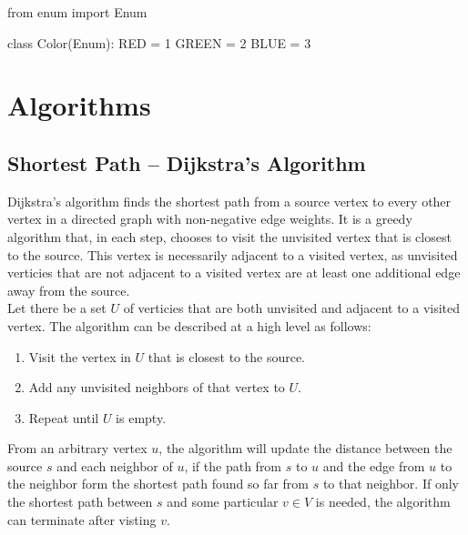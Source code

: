 \documentclass[12pt, titlepage]{article}
\begin{document}
\begin{python}
from enum import Enum

class Color(Enum):
    RED = 1
    GREEN = 2
    BLUE = 3
\end{python}

\newpage
\appendix

\section{Algorithms}

\subsection{Shortest Path -- Dijkstra's Algorithm} \label{dijkstra}

Dijkstra's algorithm finds the shortest path from a source vertex to every other vertex in a directed graph with non-negative edge weights. It is a greedy algorithm that, in each step, chooses to visit the unvisited vertex that is closest to the source. This vertex is necessarily adjacent to a visited vertex, as unvisited verticies that are not adjacent to a visited vertex are at least one additional edge away from the source. \\

Let there be a set $U$ of verticies that are both unvisited and adjacent to a visited vertex. The algorithm can be described at a high level as follows:

\begin{enumerate}
  \item Visit the vertex in $U$ that is closest to the source.
  \item Add any unvisited neighbors of that vertex to $U$.
  \item Repeat until $U$ is empty.
\end{enumerate}

From an arbitrary vertex $u$, the algorithm will update the distance between the source $s$ and each neighbor of $u$, if the path from $s$ to $u$ and the edge from $u$ to the neighbor form the shortest path found so far from $s$ to that neighbor. If only the shortest path between $s$ and some particular $v \in V$ is needed, the algorithm can terminate after visting $v$. \\
\end{document}
